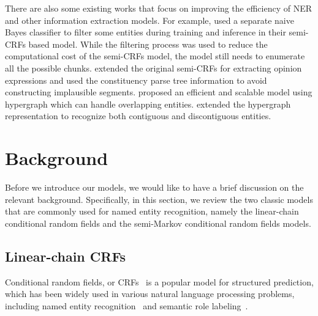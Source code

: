 There are also some existing works that focus on improving the efficiency of NER and other information extraction models.
For example, \citet{okanohara2006improving} used a separate naive Bayes classifier to filter some entities during training and inference in their semi-CRFs based model.
While the filtering process was used to reduce the computational cost of the semi-CRFs model, the model still needs to enumerate all the possible chunks. 
\citet{yang2012extracting} extended the original semi-CRFs for extracting opinion expressions and used the constituency parse tree information to avoid constructing implausible segments. 
\citet{lu2015joint} proposed an efficient and scalable model using hypergraph which can handle overlapping entities. 
\citet{muis2016learning} extended the hypergraph representation to recognize both contiguous and discontiguous entities. 
\section{Background}
Before we introduce our  models, we would like to have a brief discussion on the relevant background. 
Specifically, in this section, we  review the two classic models that are commonly used for named entity recognition, namely the linear-chain conditional random fields and the semi-Markov conditional random fields models.

\subsection{Linear-chain CRFs}
Conditional random fields, or CRFs~\cite{lafferty2001conditional} is a popular model for structured prediction, which has been widely used in various natural language processing problems, including named entity recognition~\cite{mccallum2003early} and semantic role labeling~\cite{cohn2005semantic}. 

